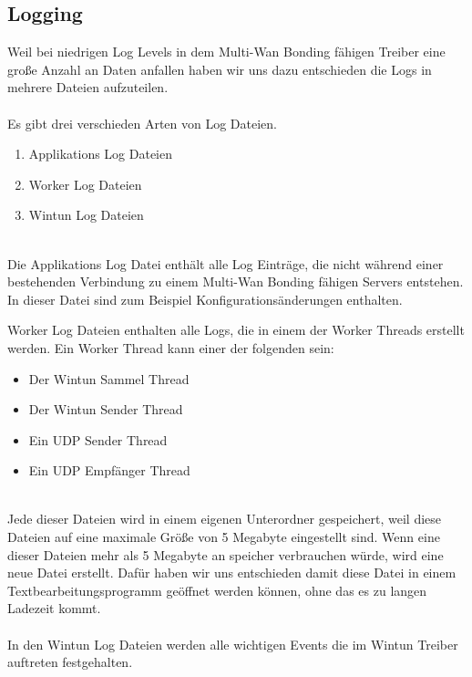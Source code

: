 \subsection{Logging}
Weil bei niedrigen Log Levels in dem Multi-Wan Bonding fähigen Treiber eine große Anzahl an Daten anfallen haben wir uns dazu entschieden die Logs in mehrere Dateien aufzuteilen.
\\\\
Es gibt drei verschieden Arten von Log Dateien.
\\
\begin{enumerate}
    \item Applikations Log Dateien
    \item Worker Log Dateien
    \item Wintun Log Dateien
\end{enumerate}
\ \\
Die Applikations Log Datei enthält alle Log Einträge, die nicht während einer bestehenden Verbindung zu einem Multi-Wan Bonding fähigen Servers entstehen. In dieser Datei sind zum Beispiel Konfigurationsänderungen enthalten.

\newpage

Worker Log Dateien enthalten alle Logs, die in einem der Worker Threads erstellt werden. Ein Worker Thread kann einer der folgenden sein:
\\
\begin{itemize}
    \item Der Wintun Sammel Thread
    \item Der Wintun Sender Thread
    \item Ein UDP Sender Thread
    \item Ein UDP Empfänger Thread
\end{itemize}
\ \\
Jede dieser Dateien wird in einem eigenen Unterordner gespeichert, weil diese Dateien auf eine maximale Größe von 5 Megabyte eingestellt sind. Wenn eine dieser Dateien mehr als 5 Megabyte an speicher verbrauchen würde, wird eine neue Datei erstellt. Dafür haben wir uns entschieden damit diese Datei in einem Textbearbeitungsprogramm geöffnet werden können, ohne das es zu langen Ladezeit kommt.
\\\\
In den Wintun Log Dateien werden alle wichtigen Events die im Wintun Treiber auftreten festgehalten.
